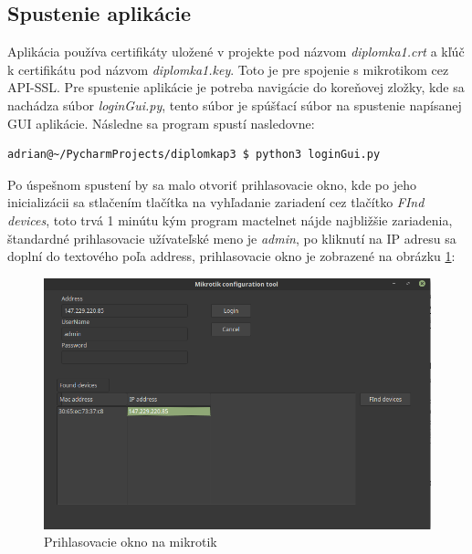 \subsection{Spustenie aplikácie}
Aplikácia používa certifikáty uložené v projekte pod názvom \textit{diplomka1.crt} a kľúč k certifikátu pod názvom \textit{diplomka1.key}. Toto je pre spojenie s mikrotikom cez API-SSL. Pre spustenie aplikácie je potreba navigácie do koreňovej zložky, kde sa nachádza súbor \textit{loginGui.py}, tento súbor je spúšťací súbor na spustenie napísanej GUI aplikácie. Následne sa program spustí nasledovne:
\begin{lstlisting}[language=bash, frame=single, caption=Spustenie aplikácie,captionpos=b, showstringspaces=false]
adrian@~/PycharmProjects/diplomkap3 $ python3 loginGui.py
\end{lstlisting}
Po úspešnom spustení by sa malo otvoriť prihlasovacie okno, kde po jeho inicializácii sa stlačením tlačítka na vyhľadanie zariadení cez tlačítko \textit{FInd devices}, toto trvá 1 minútu kým program mactelnet nájde najbližšie zariadenia, štandardné prihlasovacie užívateľské meno je \textit{admin}, po kliknutí na IP adresu sa doplní do textového poľa address, prihlasovacie okno je zobrazené na obrázku \ref{fig:winboxcustom}:
\begin{figure}[H]
\centering
\includegraphics[scale=0.48]{../text/winboxcustom.png}
\caption{Prihlasovacie okno na mikrotik}
\label{fig:winboxcustom}
\end{figure}


